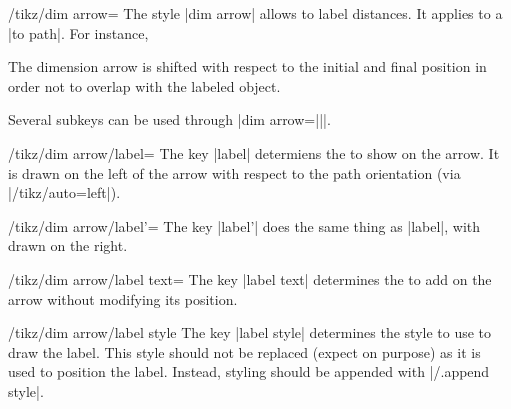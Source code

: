 \documentclass[a4paper]{ltxdoc}
\begin{document}
\begin{stylekey}{/tikz/dim arrow=}
  The style |dim arrow| allows to label distances. It applies to a |to path|. For instance,

  \begin{codeexample}[width=4cm]
  \end{codeexample}

  The dimension arrow is shifted with respect to the initial and final position in order not to overlap with the labeled object.

  Several subkeys can be used through |dim arrow={||}|.

  \begin{key}{/tikz/dim arrow/label=}
  The key |label| determiens the  to show on the arrow.
  It is drawn on the left of the arrow with respect to the path orientation (via |/tikz/auto=left|).
  \end{key}

  \begin{key}{/tikz/dim arrow/label'=}
  The key |label'| does the same thing as |label|, with  drawn on the right.
  \end{key}


\begin{codeexample}[]
\end{codeexample}

  \begin{key}{/tikz/dim arrow/label text=}
  The key |label text| determines the  to add on the arrow without modifying its position.
  \end{key}

  \begin{stylekey}{/tikz/dim arrow/label style}
  The key |label style| determines the style to use to draw the label.
  This style should not be replaced (expect on purpose) as it is used to position the label.
  Instead, styling should be appended with |/.append style|.


\end{stylekey}
\end{stylekey}
\end{document}
